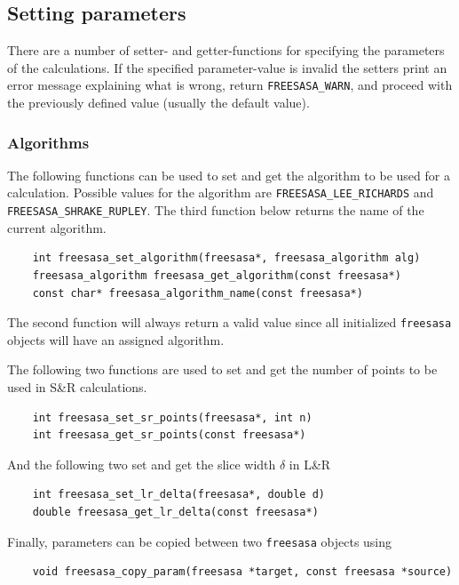 \documentclass[a4paper,11pt]{article}
\begin{document}
\subsection{Setting parameters}

There are a number of setter- and getter-functions for specifying the
parameters of the calculations. If the specified parameter-value is
invalid the setters print an error message explaining what is wrong,
return \verb|FREESASA_WARN|, and proceed with the previously defined
value (usually the default value).

\subsubsection{Algorithms}

The following functions can be used to set and get the algorithm to be
used for a calculation. Possible values for the algorithm are
\verb|FREESASA_LEE_RICHARDS| and \verb|FREESASA_SHRAKE_RUPLEY|.  The
third function below returns the name of
the current algorithm.
\begin{verbatim}
    int freesasa_set_algorithm(freesasa*, freesasa_algorithm alg)
    freesasa_algorithm freesasa_get_algorithm(const freesasa*)
    const char* freesasa_algorithm_name(const freesasa*)
\end{verbatim}
The second function will always return a valid value since all
initialized \verb|freesasa| objects will have an assigned algorithm.

The following two functions are used to set and get the number of
points to be used in S\&R calculations. 
\begin{verbatim}
    int freesasa_set_sr_points(freesasa*, int n)
    int freesasa_get_sr_points(const freesasa*)
\end{verbatim}
And the following two set and get the slice width $\delta$ in L\&R
\begin{verbatim}
    int freesasa_set_lr_delta(freesasa*, double d) 
    double freesasa_get_lr_delta(const freesasa*)
\end{verbatim}
Finally, parameters can be copied between two \verb|freesasa| objects
using
\begin{verbatim}
    void freesasa_copy_param(freesasa *target, const freesasa *source)
\end{verbatim}
\end{document}
